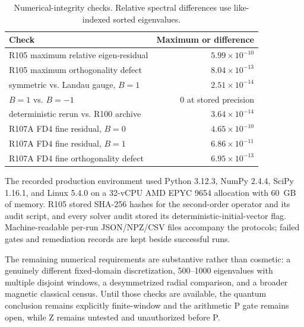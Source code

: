 \begin{table}[t]
 \centering
 \caption{Numerical-integrity checks.  Relative spectral differences use
 like-indexed sorted eigenvalues.}
 \label{tab:quantum-integrity}
 \small
 \begin{tabular}{@{}lr@{}}
 \toprule
 Check & Maximum or difference \\
 \midrule
 R105 maximum relative eigen-residual & \(5.99\times10^{-10}\) \\
 R105 maximum orthogonality defect & \(8.04\times10^{-13}\) \\
 symmetric vs. Landau gauge, \(B=1\) & \(2.51\times10^{-14}\) \\
 \(B=1\) vs. \(B=-1\) & 0 at stored precision \\
 deterministic rerun vs. R100 archive & \(3.64\times10^{-14}\) \\
 R107A FD4 fine residual, \(B=0\) & \(4.65\times10^{-10}\) \\
 R107A FD4 fine residual, \(B=1\) & \(6.86\times10^{-11}\) \\
 R107A FD4 fine orthogonality defect & \(6.95\times10^{-13}\) \\
 \bottomrule
 \end{tabular}
\end{table}

The recorded production environment used Python 3.12.3, NumPy 2.4.4, SciPy
1.16.1, and Linux 5.4.0 on a 32-vCPU AMD EPYC 9654 allocation with 60~GB of
memory.  R105 stored SHA-256 hashes for the second-order operator and its
audit script, and every solver audit stored its deterministic-initial-vector
flag.  Machine-readable per-run JSON/NPZ/CSV files accompany the protocols;
failed gates and remediation records are kept beside successful runs.

The remaining numerical requirements are substantive rather than cosmetic:
a genuinely different fixed-domain discretization, 500--1000 eigenvalues
with multiple disjoint windows, a desymmetrized radial comparison, and a
broader magnetic classical census.  Until those checks are available, the
quantum conclusion remains explicitly finite-window and the arithmetic
P gate remains open, while Z remains untested and unauthorized before P.

